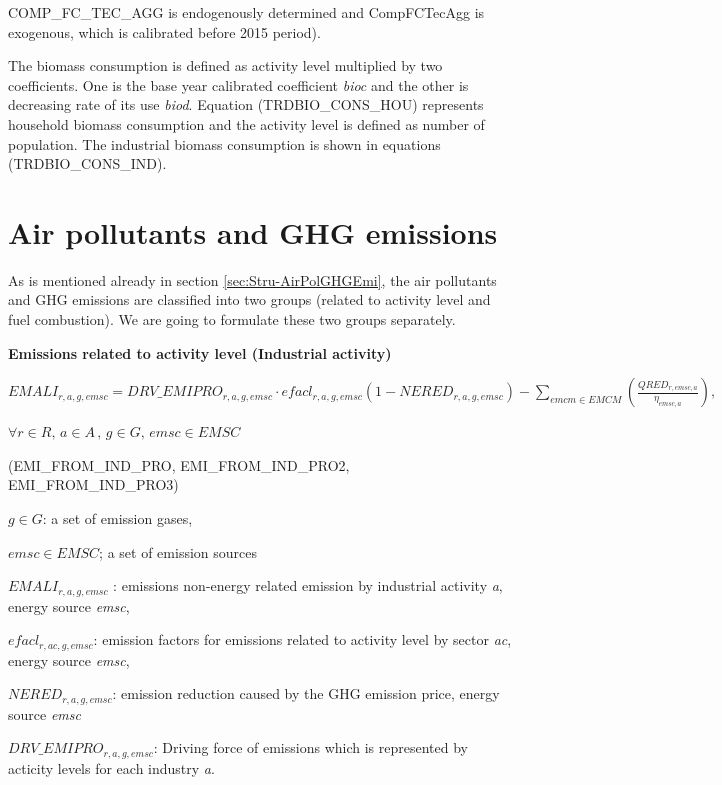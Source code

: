 \documentclass[10pt,a4paper,titlepage,dvipdfmx]{book}
\begin{document}
COMP\_FC\_TEC\_AGG  is endogenously determined and CompFCTecAgg is exogenous, which is calibrated before 2015 period).

The biomass consumption is defined as activity level multiplied by two coefficients. One is the base year calibrated coefficient \textit{bioc} and the other is decreasing rate of its use \textit{biod}. Equation (TRDBIO\_CONS\_HOU) represents household biomass consumption and the activity level is defined as number of population. The industrial biomass consumption is shown in equations (TRDBIO\_CONS\_IND).

\section{\label{sec:Math-AirPolGHGEmi}Air pollutants and GHG emissions\label{mark-4.9.}}

As is mentioned already in section \ref{sec:Stru-AirPolGHGEmi}, the air pollutants and GHG emissions are classified into two groups (related to activity level and fuel combustion). We are going to formulate these two groups separately. 

\begin{flushleft}\textbf{Emissions related to activity level (Industrial activity)}\end{flushleft}


\begin{center}$EMALI_{r,a,g,emsc}=DRV\_ EMIPRO_{r,a,g,emsc}\cdot efacl_{r,a,g,emsc}\left(1-NERED_{r,a,g,emsc}\right)-\sum _{emcm\in EMCM}\left(\frac{QRED_{r,emsc,a}}{\eta _{emsc,a}}\right),\,\,\,\,$
\end{center}


\begin{center}$\forall r\in R,\,a\in A\,,\,g\in G,\,emsc\in EMSC$    
\end{center}


\begin{flushright}(EMI\_FROM\_IND\_PRO, EMI\_FROM\_IND\_PRO2, EMI\_FROM\_IND\_PRO3)
\end{flushright}

\begin{flushleft}
$g\in G$: a set of emission gases,

$emsc\in EMSC$; a set of emission sources

$EMALI_{r,a,g,emsc}$ : emissions non-energy related emission by industrial activity \textit{a}, energy source \textit{emsc}, 

$efacl_{r,ac,g,emsc}$: emission factors for emissions related to activity level by sector \textit{ac}, energy source \textit{emsc},

$NERED_{r,a,g,emsc}$: emission reduction caused by the GHG emission price, energy source \textit{emsc}

$DRV\_EMIPRO_{r,a,g,emsc}$: Driving force of emissions which is represented by acticity levels for each industry \textit{a}.
\end{flushleft}
\end{document}
